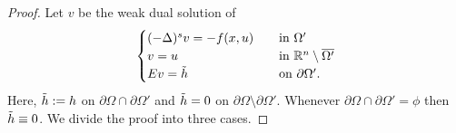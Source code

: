\documentclass{amsart}
\newcommand{\R}{\mathbb{R}}
\newcommand{\slap}{(-\Delta)^{s}}
\begin{document}
 \begin{proof}
     Let $v$ be the weak dual solution of 
     \begin{equation*}
         \begin{cases}
             \slap v= -f(x,u)\quad &\text{in }\Omega'\\
             v=u &\text{in }\R^{n}\setminus\overline{\Omega'}\\
             Ev=\Tilde{h} &\text{on }\partial\Omega'.
         \end{cases}
     \end{equation*}
     Here, $\Tilde{h}:=h$ on $\partial\Omega\cap\partial\Omega'$ and $\Tilde{h}=0$ on $\partial\Omega\setminus\partial\Omega'$. Whenever $\partial\Omega\cap\partial\Omega'=\phi$ then $\Tilde{h}\equiv0$. We divide the proof into three cases. 
     

\end{proof}
\end{document}

